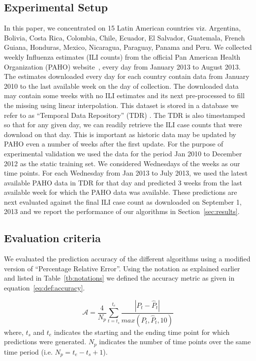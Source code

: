 

\subsection{Experimental Setup}
 In this paper, we concentrated on 15 Latin
American countries viz. Argentina, Bolivia, Costa Rica, Colombia, Chile,
Ecuador,  El Salvador, Guatemala, French Guiana, Honduras, Mexico, Nicaragua,
Paraguay, Panama and Peru. We collected weekly Influenza estimates (ILI counts)
from the official Pan American Health Organization (PAHO)
website~\cite{PAHO:2013}, every day from January 2013 to August 2013. The
estimates downloaded every day for each country contain data from January 2010 to the last
available week on the day of collection. The
downloaded data may contain some weeks with no ILI estimates and its next 
pre-processed to fill the missing using linear interpolation. 
This dataset is stored in a database we refer to as
``Temporal Data Repository'' (TDR) .  The TDR is also timestamped so that for
any given day, we can readily retrieve the ILI case
counts that were download on that day. This is important as historic data may be updated by
PAHO even a number of weeks after the first update.  For the purpose of experimental validation
we used the data for the period Jan 2010 to December 2012 as the static
training set. We considered Wednesdays of the weeks as our time points.  For
each Wednesday from Jan 2013 to July 2013, we used the latest available PAHO
data in TDR for that day and predicted 3 weeks from the last available week for
which the PAHO data was available. These predictions are next evaluated against
the final ILI case count as downloaded on September 1, 2013 and we report the
performance of our algorithms in Section~\ref{sec:results}. 

\subsection{Evaluation criteria}
 We evaluated the prediction accuracy of the
different algorithms using a modified version of ``Percentage Relative Error''.
Using the notation as explained earlier and listed in Table~\ref{tb:notations}
we defined the accuracy metric as given in equation~\ref{eq:def:accuracy}.

\begin{equation} 
    \label{eq:def:accuracy} 
    \mathcal{A} = \frac{4}{N_p}\sum \limits_{t=t_s}^{t_e}\frac{|P_t -\hat{P}_t| }{max(P_t, \hat{P}_t, 10)}
\end{equation} 
where, $t_s$ and $t_e$ indicates the starting and the ending
time point for which predictions were generated.  $N_p$ indicates the number of
time points over the same time period (i.e. $N_p = t_e - t_s + 1$). 


